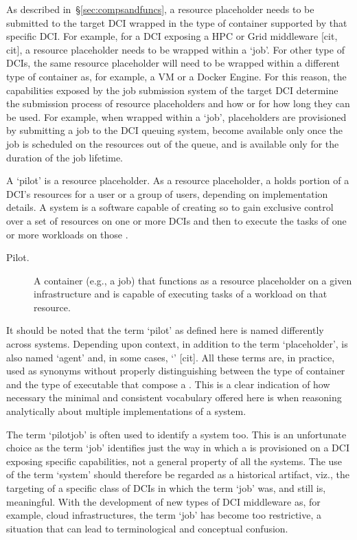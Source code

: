 \documentclass{sig-alternate}
\begin{document}
As described in~\S\ref{sec:compsandfuncs}, a resource placeholder needs to be
submitted to the target DCI wrapped in the type of container supported by that
specific DCI. For example, for a DCI exposing a HPC or Grid middleware [cit,
cit], a resource placeholder needs to be wrapped within a `job'. For other type
of DCIs, the same resource placeholder will need to be wrapped within a
different type of container as, for example, a VM or a Docker Engine. For this
reason, the capabilities exposed by the job submission system of the target DCI
determine the submission process of resource placeholders and how or for how
long they can be used. For example, when wrapped within a `job', placeholders
are provisioned by submitting a job to the DCI queuing system, become available
only once the job is scheduled on the resources out of the queue, and is
available only for the duration of the job lifetime.

A `pilot' is a resource placeholder. As a resource placeholder, a \pilot holds
portion of a DCI's resources for a user or a group of users, depending on
implementation details. A \pilot system is a software capable of creating
\pilots so to gain exclusive control over a set of resources on one or more DCIs
and then to execute the tasks of one or more workloads on those \pilots.

\begin{description}

\item[Pilot.] A container (e.g., a job) that functions as a resource
placeholder on a given infrastructure and is capable of executing tasks of a
workload on that resource.

\end{description}

It should be noted that the term `pilot' as defined here is named differently
across \pilot systems. Depending upon context, in addition to the term
`placeholder', \pilot is also named `agent' and, in some cases, `\pilotjob'
[cit]. All these terms are, in practice, used as synonyms without properly
distinguishing between the type of container and the type of executable that
compose a \pilot. This is a clear indication of how necessary the minimal and
consistent vocabulary offered here is when reasoning analytically about
multiple implementations of a \pilot system.

The term `pilotjob' is often used to identify a \pilot system too. This is an
unfortunate choice as the term `job' identifies just the way in which a \pilot
is provisioned on a DCI exposing specific capabilities, not a general
property of all the \pilot systems. The use of the term `\pilotjob system'
should therefore be regarded as a historical artifact, viz., the targeting of a
specific class of DCIs in which the term `job' was, and still is, meaningful.
With the development of new types of DCI middleware as, for example, cloud
infrastructures, the term `job' has become too restrictive, a situation that
can lead to terminological and conceptual confusion.
\end{document}
